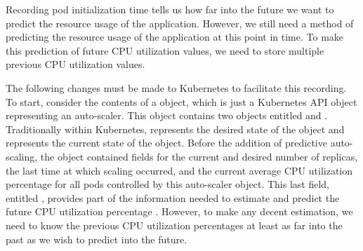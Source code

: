 Recording pod initialization time tells us how far into the future
we want to predict the resource usage of the application. However, we still need
a method of predicting the resource usage of the application at this point in
time. To make this prediction of future CPU utilization values,
we need to store multiple previous CPU utilization values.

The following changes must be made to Kubernetes to facilitate this
recording. To start,
consider the contents of a  object, which is
just a Kubernetes API object representing an auto-scaler. This object contains
two objects entitled  and
. Traditionally within
Kubernetes,  represents the desired state of the object and
 represents the current state of the object. Before the addition
of predictive auto-scaling, the  object
contained fields for the current and desired number of replicas, the last time
at which scaling occurred, and the current average CPU utilization percentage for
all pods controlled by this auto-scaler object. This last field, entitled
, provides part of the information
needed to estimate and predict the future CPU utilization
percentage \cite{k8s-horizontal-pod-autoscaler-object}.
However, to make any decent estimation, we need to know the previous CPU
utilization percentages at least as far into the past as we wish to predict into
the future.

